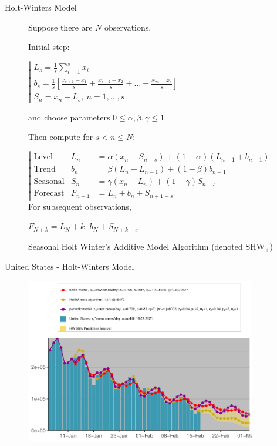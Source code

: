 \documentclass{beamer}
\begin{document}
\begin{frame}{Holt-Winters Model}
\begin{figure}[H]
\begin{tcolorbox}[width=.87\textwidth]%

Suppose there are $N$ observations.

Initial step:

$\left|\begin{array}{l}
L_s = \frac1s \sum_{i=1}^s x_i \\
b_s = \frac1s \left[\frac{x_{s+1}-x_1}{s}+\frac{x_{s+2}-x_2}{s}+\dots+\frac{x_{2s}-x_s}{s}\right]\\
S_n  = x_n-L_s, \ n=1,\dots,s
\end{array}\right.$

and choose parameters $0\leq\alpha,\beta,\gamma\leq1$

Then compute for $s<n\leq N$:

$\left|\begin{array}{lll}
\text{Level} &       L_n & = \alpha (x_n-S_{n-s})+(1-\alpha)(L_{n-1}+b_{n-1})\\
\text{Trend} &      b_n & = \beta(L_n-L_{n-1})+(1-\beta)b_{n-1}\\
\text{Seasonal} & S_n & = \gamma (x_n-L_n) + (1-\gamma)S_{n-s}\\
\text{Forecast} & F_{n+1} & = L_n+b_n+S_{n+1-s}
\end{array}\right.$
For subsequent observations,

$F_{N+k}=L_N+k\cdot b_N+S_{N+k-s}$
\label{SHWx}
\end{tcolorbox}
\caption{Seasonal Holt Winter’s Additive Model Algorithm (denoted SHW$_{+}$)}
\end{figure}
\end{frame}

\begin{frame}{United States - Holt-Winters Model}
\begin{figure}
\includegraphics[width=0.9\textwidth]{Plots/United States-hw.pdf}
\end{figure}
\end{frame}
\end{document}
